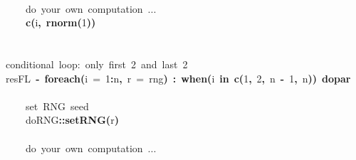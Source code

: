 \documentclass[a4paper,12pt]{article}\usepackage{graphicx, color}
\makeatletter
\newcommand{\hlnumber}[1]{\textcolor[rgb]{0,0,0}{#1}}%
\newcommand{\hlfunctioncall}[1]{\textcolor[rgb]{0.501960784313725,0,0.329411764705882}{\textbf{#1}}}%
\newcommand{\hlkeyword}[1]{\textcolor[rgb]{0,0,0}{\textbf{#1}}}%
\newcommand{\hlargument}[1]{\textcolor[rgb]{0.690196078431373,0.250980392156863,0.0196078431372549}{#1}}%
\newcommand{\hlcomment}[1]{\textcolor[rgb]{0.180392156862745,0.6,0.341176470588235}{#1}}%
\newcommand{\hlassignement}[1]{\textcolor[rgb]{0,0,0}{\textbf{#1}}}%
\newcommand{\hlpackage}[1]{\textcolor[rgb]{0.588235294117647,0.709803921568627,0.145098039215686}{#1}}%
\newcommand{\hlsymbol}[1]{\textcolor[rgb]{0,0,0}{#1}}%
\newcommand{\hlstd}[1]{\textcolor[rgb]{0,0,0}{#1}}%
\newenvironment{kframe}{%
 \def\FrameCommand##1{\hskip\@totalleftmargin \hskip-\fboxsep
 \colorbox{shadecolor}{##1}\hskip-\fboxsep
     \hskip-\linewidth \hskip-\@totalleftmargin \hskip\columnwidth}%
 \MakeFramed {\advance\hsize-\width
   \@totalleftmargin\z@ \linewidth\hsize
   \@setminipage}}%
 {\par\unskip\endMakeFramed}
\newenvironment{knitrout}{}{} %
\renewenvironment{knitrout}{\begin{footnotesize}}{\end{footnotesize}}
\makeatother
\begin{document}
\begin{knitrout}
\begin{kframe}
\begin{flushleft}
\hlstd{}\hspace*{\fill}\\
\hlstd{}{\ }{\ }{\ }{\ }\hlcomment{\usebox{\hlnormalsizeboxhash}{\ }do{\ }your{\ }own{\ }computation{\ }...}\hspace*{\fill}\\
\hlstd{}{\ }{\ }{\ }{\ }\hlfunctioncall{c}\hlkeyword{(}\hlsymbol{i}\hlkeyword{,}{\ }\hlfunctioncall{rnorm}\hlkeyword{(}\hlnumber{1}\hlkeyword{)}\hlkeyword{)}\hspace*{\fill}\\
\hlstd{}\hlkeyword{\usebox{\hlnormalsizeboxclosebrace}}\hspace*{\fill}\\
\hlstd{}\hspace*{\fill}\\
\hlstd{}\hlcomment{\usebox{\hlnormalsizeboxhash}{\ }conditional{\ }loop:{\ }only{\ }first{\ }2{\ }and{\ }last{\ }2}\hspace*{\fill}\\
\hlstd{}\hlsymbol{resFL}{\ }\hlassignement{\usebox{\hlnormalsizeboxlessthan}-}{\ }\hlfunctioncall{foreach}\hlkeyword{(}\hlargument{i}{\ }\hlargument{=}{\ }\hlnumber{1}\hlkeyword{:}\hlsymbol{n}\hlkeyword{,}{\ }\hlargument{r}{\ }\hlargument{=}{\ }\hlsymbol{rng}\hlkeyword{)}{\ }\hlkeyword{\usebox{\hlnormalsizeboxpercent}:\usebox{\hlnormalsizeboxpercent}}{\ }\hlfunctioncall{when}\hlkeyword{(}\hlsymbol{i}{\ }\hlkeyword{\usebox{\hlnormalsizeboxpercent}in\usebox{\hlnormalsizeboxpercent}}{\ }\hlfunctioncall{c}\hlkeyword{(}\hlnumber{1}\hlkeyword{,}{\ }\hlnumber{2}\hlkeyword{,}{\ }\hlsymbol{n}{\ }\hlkeyword{-}{\ }\hlnumber{1}\hlkeyword{,}{\ }\hlsymbol{n}\hlkeyword{)}\hlkeyword{)}{\ }\hlkeyword{\usebox{\hlnormalsizeboxpercent}dopar\usebox{\hlnormalsizeboxpercent}}{\ }\hlkeyword{\usebox{\hlnormalsizeboxopenbrace}}\hspace*{\fill}\\
\hlstd{}\hspace*{\fill}\\
\hlstd{}{\ }{\ }{\ }{\ }\hlcomment{\usebox{\hlnormalsizeboxhash}{\ }set{\ }RNG{\ }seed}\hspace*{\fill}\\
\hlstd{}{\ }{\ }{\ }{\ }\hlpackage{doRNG}\hlkeyword{::}\hlfunctioncall{setRNG}\hlkeyword{(}\hlsymbol{r}\hlkeyword{)}\hspace*{\fill}\\
\hlstd{}\hspace*{\fill}\\
\hlstd{}{\ }{\ }{\ }{\ }\hlcomment{\usebox{\hlnormalsizeboxhash}{\ }do{\ }your{\ }own{\ }computation{\ }...}\hspace*{\fill}\\

\end{flushleft}
\end{kframe}
\end{knitrout}
\end{document}
